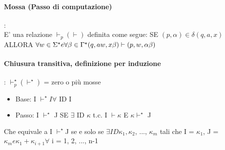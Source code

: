 \documentclass[12pt, a4paper, openany, oneside]{book}
\begin{document}
\paragraph{Mossa (Passo di computazione)}:\\
E' una relazione $\vdash_{p} (\vdash)$ definita come segue: SE $(p, \alpha) \in 
\delta (q, a, x)$ ALLORA $\forall w \in \Sigma^{\star} e \forall \beta \in \Gamma^{\star}\\
(q, aw, x\beta) \vdash (p, w, \alpha \beta)$
\paragraph{Chiusura transitiva, definizione per induzione}: 
$\vdash^{\star}_{p}  (\vdash^{\star})$ = zero o più mosse
\begin{itemize}
	\item Base: I $\vdash^{\star} I \forall$ ID I
	\item Passo: I $\vdash^{\star}$ J SE $\exists$ ID $\kappa$ t.c. I $\vdash \kappa$  E
	$\kappa \vdash^{\star}$ J
\end{itemize}
Che equivale a I $\vdash^{\star}$J se e solo se $\exists ID \kappa_{1}, \kappa_{2}$,
..., $\kappa_{m}$ tali che I = $\kappa_{1}$, J = $\kappa_{m} e \kappa_{1} + \kappa_{i+1} 
\forall$ i = 1, 2, ..., n-1
\end{document}
